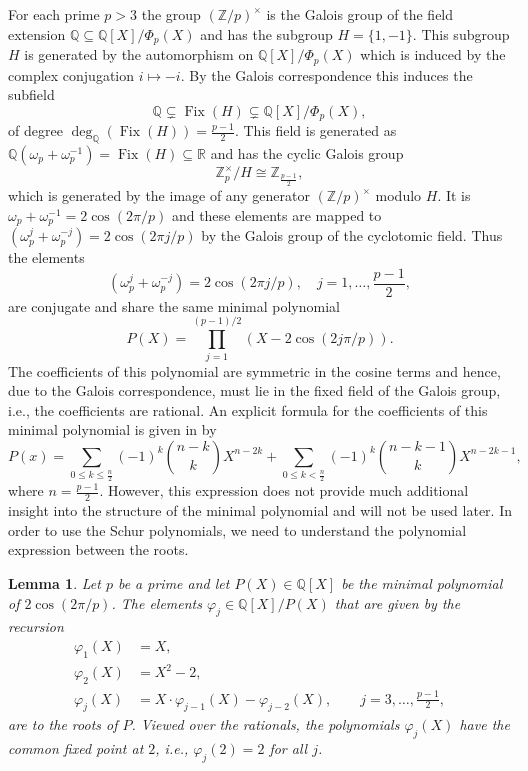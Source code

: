 \documentclass[a4paper]{article}
\renewcommand{\o}{\omega}
\newcommand{\Z}{\ensuremath{\mathbb{Z}}}
\newcommand{\Q}{\ensuremath{\mathbb{Q}}}
\newcommand{\R}{\ensuremath{\mathbb{R}}}
\newcommand{\Fix}{\operatorname{Fix}}
\newtheorem{lemma}[theorem]{Lemma}
\numberwithin{equation}{section}
\numberwithin{table}{section}
\numberwithin{figure}{section}
\begin{document}
For each prime $p>3$ the group $(\Z/p)^\times$ is the Galois group of the field extension $\Q \subseteq \Q[X]/\Phi_p(X)$ and has the subgroup $H=\{1,-1\}$. This subgroup $H$ is generated by the automorphism on $\Q[X]/\Phi_p(X)$ which is induced by the complex conjugation $i \mapsto -i$. By the Galois correspondence this induces the subfield
\[
\Q \subsetneq \Fix(H) \subsetneq \Q[X]/\Phi_p(X),
\]
of degree $\deg_{\Q}(\Fix(H))=\frac{p-1}{2}$. This field is generated as $\Q(\o_p+\o_p^{-1})=\Fix(H) \subseteq \R$ and has the cyclic Galois group
\[\Z_p^\times/H\cong \Z_{\frac{p-1}{2}},
\]
which is generated by the image of any generator $(\Z/p)^\times$ modulo $H$. It is $\o_p+\o_p^{-1}=2 \cos (2 \pi /p)$ and these elements are mapped to $(\o_p^j+\o_p^{-j})=2\cos(2 \pi j /p)$ by the Galois group of the cyclotomic field. Thus the elements
\[
(\o_p^{j}+\o_p^{-j})=2 \cos (2 \pi j/p), \quad j=1,\ldots,\frac{p-1}{2},
\]
are conjugate and share the same minimal polynomial
\[
P(X)=\prod_{j=1}^{(p-1)/2}(X-2\cos(2 j \pi /p)).
\]
The coefficients of this polynomial are symmetric in the cosine terms and hence, due to the Galois correspondence, must lie in the fixed field of the Galois group, i.e., the coefficients are rational. An explicit formula for the coefficients of this minimal polynomial is given in \cite{CosineMinimalPolynomial} by
    \[
    P(x)=\sum\limits_{0\leq k \leq \frac{n}{2}}(-1)^k\binom{n-k}{k}X^{n-2k}+\sum\limits_{0 \leq k < \frac{n}{2}}(-1)^k \binom{n-k-1}{k}X^{n-2k-1},
    \]
where $n=\frac{p-1}{2}$. However, this expression does not provide much additional insight into the structure of the minimal polynomial and will not be used later.
In order to use the Schur polynomials, we need to understand the polynomial expression between the roots.
\begin{lemma}\label{Galoisgroupcosine}
    Let $p$ be a prime and let $P(X) \in \Q[X]$ be the minimal polynomial of $2\cos(2 \pi /p)$. The elements $\varphi_j \in \Q[X]/P(X)$ that are given by the recursion
    \begin{align*}
    \varphi_1(X)&=X,\\
    \varphi_2(X)&=X^2-2,\\
    \varphi_{j}(X)&=X \cdot \varphi_{j-1}(X)-\varphi_{j-2}(X),\qquad
    j=3,\ldots,\frac{p-1}{2}, 
    \end{align*}
    are to the roots of $P$. Viewed over the rationals, the polynomials $\varphi_j(X)$ have the common fixed point at $2$, i.e., $\varphi_j(2)=2$ for all $j$.
\end{lemma}
\end{document}
